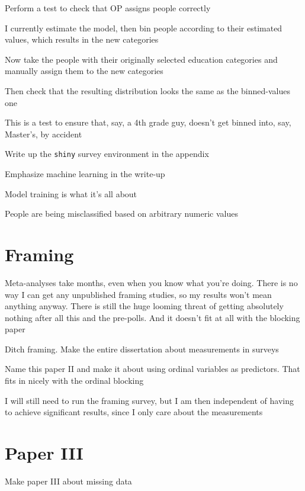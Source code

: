 \begin{coi}
		\item Perform a test to check that OP assigns people correctly
			\begin{coi}
				\item I currently estimate the model, then bin people according to their estimated values, which results in the new categories
				\item Now take the people with their originally selected education categories and manually assign them to the new categories
				\item Then check that the resulting distribution looks the same as the binned-values one
				\item This is a test to ensure that, say, a 4th grade guy, doesn't get binned into, say, Master's, by accident
			\end{coi}
		\item Write up the \texttt{shiny} survey environment in the appendix
		\item Emphasize machine learning in the write-up
			\begin{coi}
				\item Model training is what it's all about
				\item People are being misclassified based on arbitrary numeric values
			\end{coi}
	\end{coi}

\section*{Framing}
	\begin{coi}
		\item Meta-analyses take months, even when you know what you're doing. There is no way I can get any unpublished framing studies, so my results won't mean anything anyway. There is still the huge looming threat of getting absolutely nothing after all this and the pre-polls. And it doesn't fit at all with the blocking paper
		\item Ditch framing. Make the entire dissertation about measurements in surveys
		\item Name this paper II and make it about using ordinal variables as predictors. That fits in nicely with the ordinal blocking
		\item I will still need to run the framing survey, but I am then independent of having to achieve significant results, since I only care about the measurements
	\end{coi}

\section*{Paper III}
	\begin{coi}
		\item Make paper III about missing data
	\end{coi}






